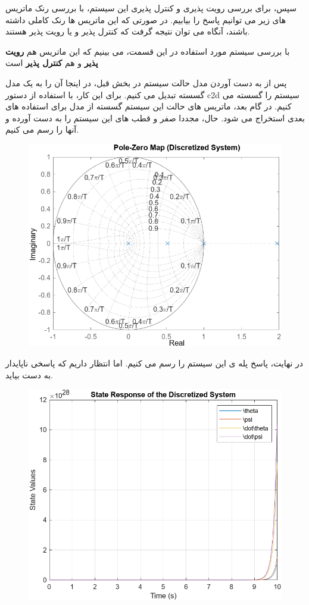 سپس، برای بررسی رویت پذیری و کنترل پذیری این سیستم، با بررسی رنک ماتریس های زیر می توانیم پاسخ را بیابیم. در صورتی که این ماتریس ها رنک کاملی داشته باشند، آنگاه می توان نتیجه گرفت که کنترل پذیر و یا رویت پذیر هستند. 

با بررسی سیستم مورد استفاده در این قسمت، می بینیم که این ماتریس هم \textbf{رویت پذیر} و هم \textbf{کنترل پذیر} است

پس از به دست آوردن مدل حالت سیستم در بخش قبل، در اینجا آن را به یک مدل گسسته تبدیل می کنیم. برای این کار، با استفاده از دستور
 c2d
  سیستم را گسسته می کنیم. در گام بعد، ماتریس های حالت این سیستم گسسته از مدل برای استفاده های بعدی استخراج می شود. حال، مجددا صفر و قطب های این سیستم را به دست آورده و آنها را رسم می کنیم.
	
\begin{figure}[H]
	\centering
	\includegraphics[width=0.7\linewidth]{../img/discrete_Poles}
	\caption{}
	\label{fig:discretepoles}
\end{figure}

در نهایت، پاسخ پله ی این سیستم را رسم می کنیم. اما انتظار داریم که پاسخی ناپایدار به دست بیاید.
\begin{figure}[H]
	\centering
	\includegraphics[width=0.9\linewidth]{../img/discrete_response}
	\caption{}
	\label{fig:discreteresponse}
\end{figure}


